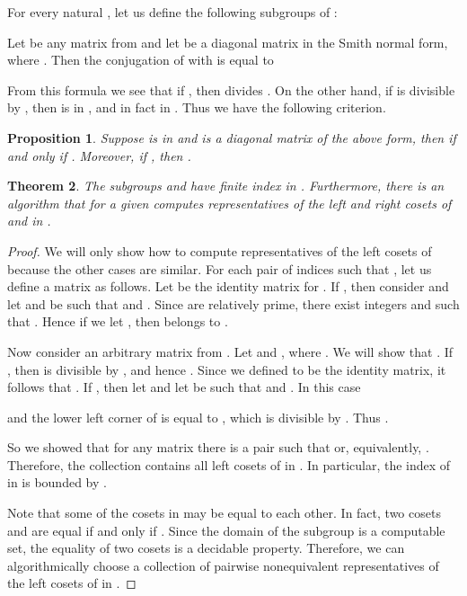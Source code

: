 \documentclass[fontsize=11pt,DIV=13,paper=letter]{scrartcl}
\newtheorem{theorem}{Theorem}\newtheorem{proposition}[theorem]{Proposition}
\theoremstyle{definition}
\begin{document}
For every natural , let us define the following subgroups of :


Let  be any matrix from  and let  be a diagonal matrix in the Smith normal form, where . Then the conjugation of  with  is equal to


From this formula we see that if , then  divides . On the other hand, if  is divisible by , then  is in , and in fact in . Thus we have the following criterion.
\begin{proposition}\label{prop:conj}
Suppose  is in  and  is a diagonal matrix of the above form, then  if and only if . Moreover, if , then .
\end{proposition}

\begin{theorem}\label{thm:ind}
The subgroups  and  have finite index in . Furthermore, there is an algorithm that for a given  computes representatives of the left and right cosets of  and  in .
\end{theorem}

\begin{proof}
We will only show how to compute representatives of the left cosets of  because the other cases are similar. For each pair of indices  such that , let us define a matrix  as follows. Let  be the identity matrix for . If , then consider  and let  and  be such that  and . Since  are relatively prime, there exist integers  and  such that . Hence if we let , then  belongs to .

Now consider an arbitrary matrix  from . Let  and , where . We will show that . If , then  is divisible by , and hence . Since we defined  to be the identity matrix, it follows that . If , then let  and let  be such that  and . In this case

and the lower left corner of  is equal to , which is divisible by . Thus .

So we showed that for any matrix  there is a pair  such that  or, equivalently, . Therefore, the collection  contains all left cosets of  in . In particular, the index of  in  is bounded by .

Note that some of the cosets in  may be equal to each other. In fact, two cosets  and  are equal if and only if . Since the domain of the subgroup  is a computable set, the equality of two cosets is a decidable property. Therefore, we can algorithmically choose a collection of pairwise nonequivalent representatives of the left cosets of  in .

\end{proof}
\end{document}
